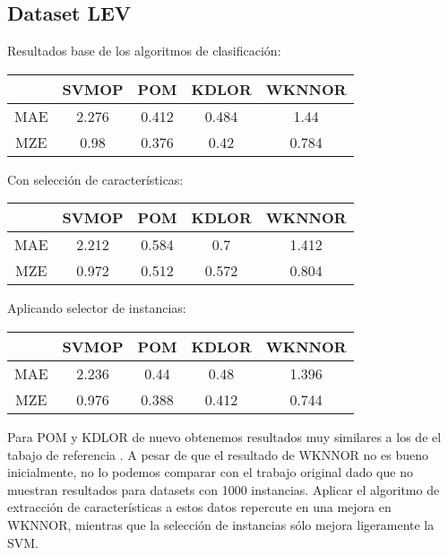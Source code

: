 \subsection{Dataset LEV}
Resultados base de los algoritmos de clasificación:
\begin{center}
\begin{tabular}{ c c c c c }
	& SVMOP & POM & KDLOR & WKNNOR  \\
	\hline	
	MAE &   2.276  & 0.412 & 0.484 &  1.44  \\
	MZE &	0.98 & 0.376 & 0.42 & 0.784  \\
	\hline  
\end{tabular}
\end{center}
\vspace{20pt}
 Con selección de características:
 \begin{center}
 \begin{tabular}{ c c c c c }
 	& SVMOP & POM & KDLOR & WKNNOR  \\
 	\hline	
 	MAE &   2.212  & 0.584 & 0.7 &  1.412 \\
 	MZE &	0.972 & 0.512 & 0.572 & 0.804  \\
 	\hline  
 \end{tabular}
\end{center}
\vspace{20pt}
Aplicando selector de instancias:
\begin{center}
 \begin{tabular}{ c c c c c }
	& SVMOP & POM & KDLOR & WKNNOR  \\
	\hline	
	MAE &   2.236  & 0.44 & 0.48 &  1.396 \\
	MZE &	0.976 & 0.388 & 0.412 & 0.744  \\
	\hline  
\end{tabular}
\end{center}

Para POM y KDLOR de nuevo obtenemos resultados muy similares a los de el tabajo de referencia \cite{Gutiérrez2016}. A pesar de que el resultado de WKNNOR no es bueno inicialmente, no lo podemos comparar con el trabajo original \cite{duivesteijn2008nearest} dado que no muestran resultados para datasets con 1000 instancias. Aplicar el algoritmo de extracción de características a estos datos repercute en una mejora en WKNNOR, mientras que la selección de instancias sólo mejora ligeramente la SVM.
